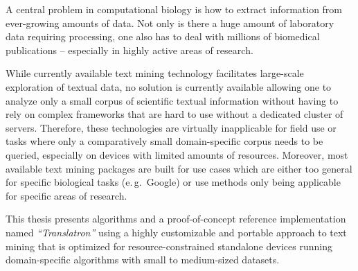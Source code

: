 \documentclass[a4paper, 12pt, twoside, reqn]{report}
\numberwithin{figure}{chapter}
\newenvironment{abstractpage}
  {\cleardoublepage\vspace*{\fill}\thispagestyle{empty}}
  {\vfill\cleardoublepage}
\renewenvironment{abstract}[1]
  {\bigskip\selectlanguage{#1}%
   \begin{center}\bfseries\abstractname\end{center}}
  {\par\bigskip}
\newtheorem[L]{boxedDefinition}{Definition}
\newtheorem[L]{boxedExample}{Example}
\newcommand{\eg}{e.\,g.\ }
\begin{document}
\begin{abstractpage}
\begin{abstract}{english}
A central problem in computational biology is how to extract information
from ever-growing amounts of data. Not only is there a huge amount of
laboratory data requiring processing, one also has to deal with millions
of biomedical publications -- especially in highly active areas of research.

While currently available text mining technology facilitates large-scale
exploration of textual data, no solution is currently available allowing one to
analyze only a small corpus of scientific textual information without having to
rely on complex frameworks that are hard to use without a dedicated
cluster of servers. Therefore, these technologies are virtually inapplicable for field use or
tasks where only a comparatively small domain-specific corpus needs to be queried, especially on devices with limited amounts of resources.
Moreover, most available text mining packages are built for use cases
which are either too general for specific biological tasks (\eg Google)
or use methods only being applicable for specific areas of research.

This thesis presents algorithms and a proof-of-concept reference implementation named \textit{``Translatron''} using a highly customizable and portable approach to text mining that is optimized for resource-constrained standalone devices running domain-specific algorithms with small to medium-sized datasets.
\vfill
\end{abstract}
\end{abstractpage}
\end{document}
